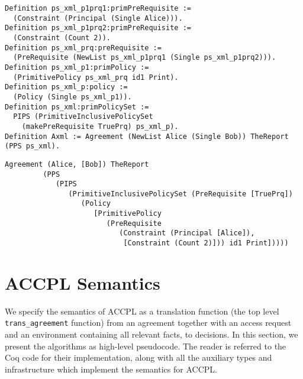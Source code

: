 \documentclass[runningheads,a4paper]{llncs}
\newcommand{\syn}{\texttt}
\begin{document}
\begin{lstlisting}
Definition ps_xml_p1prq1:primPreRequisite := 
  (Constraint (Principal (Single Alice))).
Definition ps_xml_p1prq2:primPreRequisite := 
  (Constraint (Count 2)).
Definition ps_xml_prq:preRequisite := 
  (PreRequisite (NewList ps_xml_p1prq1 (Single ps_xml_p1prq2))).
Definition ps_xml_p1:primPolicy := 
  (PrimitivePolicy ps_xml_prq id1 Print).
Definition ps_xml_p:policy := 
  (Policy (Single ps_xml_p1)).
Definition ps_xml:primPolicySet :=
  PIPS (PrimitiveInclusivePolicySet
    (makePreRequisite TruePrq) ps_xml_p).
Definition Axml := Agreement (NewList Alice (Single Bob)) TheReport (PPS ps_xml).
\end{lstlisting}

\begin{lstlisting}
Agreement (Alice, [Bob]) TheReport
         (PPS
            (PIPS
               (PrimitiveInclusivePolicySet (PreRequisite [TruePrq])
                  (Policy
                     [PrimitivePolicy
                        (PreRequisite
                           (Constraint (Principal [Alice]),
                            [Constraint (Count 2)])) id1 Print]))))

\end{lstlisting}

\section{ACCPL Semantics}
We specify the semantics of \ac{ACCPL} as a translation function (the top level \syn{trans_agreement} function) from
an agreement together with an access request and an environment
containing all relevant facts, to decisions.  In this section, we
present the algorithms as high-level pseudocode.  The reader is
referred to the Coq code for their implementation, along with all the
auxiliary types and infrastructure which implement the semantics for
\ac{ACCPL}.
\end{document}
